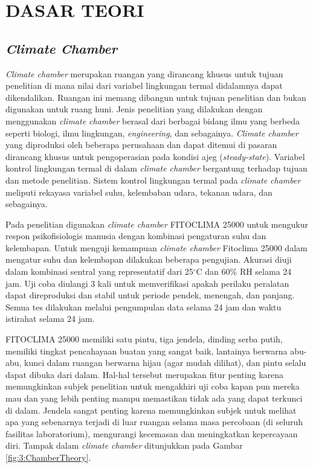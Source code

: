 \chapter{DASAR TEORI}
\label{dasar-teori}

\section{\textit{Climate Chamber}}

\textit{Climate chamber} merupakan ruangan yang dirancang khusus untuk tujuan penelitian di mana nilai dari variabel lingkungan termal didalamnya dapat dikendalikan. Ruangan ini memang dibangun untuk tujuan penelitian dan bukan digunakan untuk ruang huni. Jenis penelitian yang dilakukan dengan menggunakan \textit{climate chamber} berasal dari berbagai bidang ilmu yang berbeda seperti biologi, ilmu lingkungan, \textit{engineering}, dan sebagainya. \textit{Climate chamber} yang diproduksi oleh beberapa perusahaan dan dapat ditemui di pasaran dirancang khusus untuk pengoperasian pada kondisi ajeg (\textit{steady-state}). Variabel kontrol lingkungan termal di dalam \textit{climate chamber} bergantung terhadap tujuan dan metode penelitian. Sistem kontrol lingkungan termal pada \textit{climate chamber} meliputi rekayasa variabel suhu, kelembaban udara, tekanan udara, dan sebagainya.

Pada penelitian \cite{paperChamber} digunakan \textit{climate chamber} FITOCLIMA 25000 untuk mengukur respon psikofisiologis manusia dengan kombinasi pengaturan suhu dan kelembapan. Untuk menguji kemampuan \textit{climate chamber} Fitoclima 25000 dalam mengatur suhu dan kelembapan dilakukan beberapa pengujian. Akurasi diuji dalam kombinasi sentral yang representatif dari 25$^\circ$C dan 60\% RH selama 24 jam. Uji coba diulangi 3 kali untuk memverifikasi apakah perilaku peralatan dapat direproduksi dan stabil untuk periode pendek, menengah, dan panjang. Semua tes dilakukan melalui pengumpulan data selama 24 jam dan waktu istirahat selama 24 jam.

FITOCLIMA 25000 memiliki satu pintu, tiga jendela, dinding serba putih, memiliki tingkat pencahayaan buatan yang sangat baik, lantainya berwarna abu-abu, kunci dalam ruangan berwarna hijau (agar mudah dilihat), dan pintu selalu dapat dibuka dari dalam. Hal-hal tersebut merupakan fitur penting karena memungkinkan subjek penelitian untuk mengakhiri uji coba kapan pun mereka mau dan yang lebih penting mampu memastikan tidak ada yang dapat terkunci di dalam. Jendela sangat penting karena memungkinkan subjek untuk melihat apa yang sebenarnya terjadi di luar ruangan selama masa percobaan (di seluruh fasilitas laboratorium), mengurangi kecemasan dan meningkatkan kepercayaan diri. Tampak dalam \textit{climate chamber} ditunjukkan pada Gambar \ref{fig:3:ChamberTheory}.

